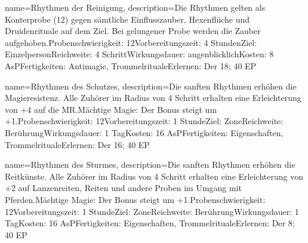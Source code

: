 {
    name={Rhythmen der Reinigung},
    description={Die Rhythmen gelten als Konterprobe (12) gegen sämtliche Einflusszauber, Hexenflüche und Druidenrituale auf dem Ziel. Bei gelungener Probe werden die Zauber aufgehoben.\newline Probenschwierigkeit: 12\newline Vorbereitungszeit: 4 Stunden\newline Ziel: Einzelperson\newline Reichweite: 4 Schritt\newline Wirkungsdauer: augenblicklich\newline Kosten: 8 AsP\newline Fertigkeiten: Antimagie, Trommelrituale\newline Erlernen: Der 18; 40 EP}
}


{
    name={Rhythmen des Schutzes},
    description={Die sanften Rhythmen erhöhen die Magieresistenz. Alle Zuhörer im Radius von 4 Schritt erhalten eine Erleichterung von +4 auf die MR.\newline Mächtige Magie: Der Bonus steigt um +1.\newline Probenschwierigkeit: 12\newline Vorbereitungszeit: 1 Stunde\newline Ziel: Zone\newline Reichweite: Berührung\newline Wirkungsdauer: 1 Tag\newline Kosten: 16 AsP\newline Fertigkeiten: Eigenschaften, Trommelrituale\newline Erlernen: Der 16; 40 EP}
}


{
    name={Rhythmen des Sturmes},
    description={Die sanften Rhythmen erhöhen die Reitkünste. Alle Zuhörer im Radius von 4 Schritt erhalten eine Erleichterung von +2 auf Lanzenreiten, Reiten und andere Proben im Umgang mit Pferden.\newline Mächtige Magie: Der Bonus steigt um +1.\newline Probenschwierigkeit: 12\newline Vorbereitungszeit: 1 Stunde\newline Ziel: Zone\newline Reichweite: Berührung\newline Wirkungsdauer: 1 Tag\newline Kosten: 16 AsP\newline Fertigkeiten: Eigenschaften, Trommelrituale\newline Erlernen: Der 8; 40 EP}
}



